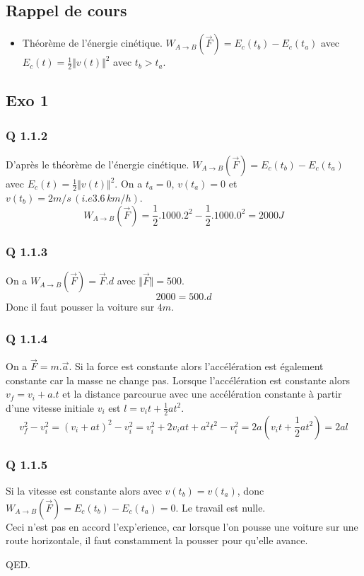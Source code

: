 \documentclass[]{book}
\theoremstyle{definition}
\begin{document}
\subsection*{Rappel de cours}
\begin{itemize}
\item Th\'eor\`eme de l'\'energie cin\'etique. $W_{A \to B}(\overrightarrow{F}) = E_c(t_b) - E_c(t_a)$ avec $E_c(t) = \frac{1}{2}\Vert v(t) \Vert^2$ avec $t_b>t_a$.
\end{itemize}


\subsection*{Exo 1}

\subsubsection*{Q 1.1.2}
D'apr\`es le th\'eor\`eme de l'\'energie cin\'etique. $W_{A \to B}(\overrightarrow{F}) = E_c(t_b) - E_c(t_a)$ avec $E_c(t) = \frac{1}{2}\Vert v(t) \Vert^2$. On a $t_a=0$, $v(t_a) = 0$ et $v(t_b) = 2m/s \,(i.e 3.6\, km/h)$.\\
$$W_{A \to B}(\overrightarrow{F}) = \frac{1}{2}.1000.2^2 - \frac{1}{2}.1000.0^2 = 2000J$$

\subsubsection*{Q 1.1.3}
On a $W_{A \to B}(\overrightarrow{F}) = \overrightarrow{F}.d$ avec $\Vert \overrightarrow{F} \Vert = 500$.
$$2000 = 500.d$$
Donc il faut pousser la voiture sur $4m$.

\subsubsection*{Q 1.1.4}
On a $\overrightarrow{F} = m.\overrightarrow{a}$. Si la force est constante alors l'acc\'el\'eration est \'egalement constante car la masse ne change pas. Lorsque l'acc\'el\'eration est constante alors $v_f = v_i + a.t$ et la distance parcourue avec une acc\'el\'eration constante \`a partir d'une vitesse initiale $v_i$ est $l=v_it+\frac{1}{2}at^2$.
$$v_f^2 - v_i^2 = (v_i + at)^2 - v_i^2 = v_i^2 + 2 v_iat + a^2t^2 - v_i^2 = 2a(v_it + \frac{1}{2}at^2) = 2al$$

\subsubsection*{Q 1.1.5}
Si la vitesse est constante alors avec $v(t_b) = v(t_a)$, donc $W_{A \to B}(\overrightarrow{F}) = E_c(t_b) - E_c(t_a) = 0$. Le travail est nulle.\\

Ceci n'est pas en accord l'exp'erience, car lorsque l'on pousse une voiture sur une route horizontale, il faut constamment la pousser pour qu'elle avance. 


QED.
\end{document}

